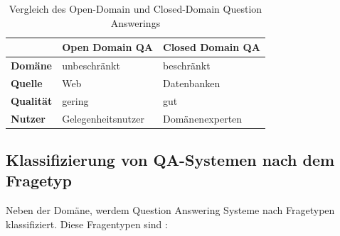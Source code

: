 \documentclass[
        ngerman,
        paper=a4,
        numbers=noendperiod,
]{scrreprt}
\begin{document}
\begin{table}[H]
{\small
    \begin{tabularx}{\textwidth}{X|X|X} 
    
                  &\textbf{Open Domain QA}  & \textbf{Closed Domain QA}  \\ 
\hline    
    \textbf{Domäne}      & unbeschränkt        & beschränkt         \\ 
    \textbf{Quelle}   & Web        & Datenbanken          \\ 
    \textbf{Qualität} & gering        & gut           \\ 
    \textbf{Nutzer} & Gelegenheitsnutzer        & Domänenexperten           \\ 
    \end{tabularx}
\caption{Vergleich des Open-Domain und Closed-Domain Question Answerings}
    \label{tab:tab1}
}
\end{table}

\subsection{Klassifizierung von QA-Systemen nach dem Fragetyp}

Neben der Domäne, werdem Question Answering Systeme nach Fragetypen klassifiziert. Diese Fragentypen sind \citep[S. 20-21]{ChandraASystem}:
\end{document}
